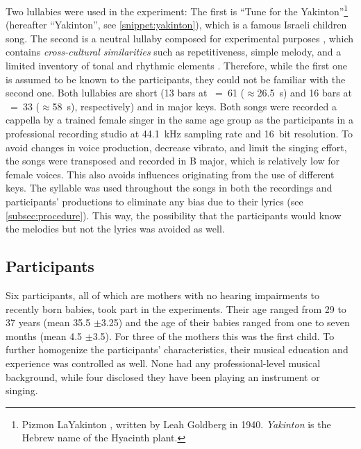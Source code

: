 Two lullabies were used in the experiment: The first is \enquote{Tune for the Yakinton}\footnote{Pizmon LaYakinton%
, written by Leah Goldberg in 1940. \emph{Yakinton} is the Hebrew name of the Hyacinth plant.} (hereafter \enquote{Yakinton}, see \cref{snippet:yakinton}), which is a famous Israeli children song.
The second is a neutral lullaby composed for experimental purposes \citep[][pp.~22-47, see \cref{snippet:uni-lullaby}]{Twig2016universal}, which contains \emph{cross-cultural similarities} such as repetitiveness, simple melody, and a limited inventory of tonal and rhythmic elements \citep{Unyk1992lullabies, Trehub1993maternal}.
Therefore, while the first one is assumed to be known to the participants, they could not be familiar with the second one.
Both lullabies are short (13 bars at \musQuarter~=~61 ($\approx$\SI{26.5}{\second}) and 16 bars at \musQuarterDotted~=~33 ($\approx$\SI{58}{\second}), respectively) and in major keys.
Both songs were recorded a cappella by a trained female singer in the same age group as the participants in a professional recording studio at \SI{44.1}{\kilo\hertz} sampling rate and 16~bit resolution.
To avoid changes in voice production, decrease vibrato, and limit the singing effort, the songs were transposed and recorded in B major, which is relatively low for female voices.
This also avoids influences originating from the use of different keys.
The syllable \textipa{[na]} was used throughout the songs in both the recordings and participants' productions to eliminate any bias due to their lyrics (see \cref{subsec:procedure}).
This way, the possibility that the participants would know the melodies but not the lyrics was avoided as well.

\subsection{Participants}
\label{subsec:participants}

Six participants, all of which are mothers with no hearing impairments to recently born babies, took part in the experiments.
Their age ranged from 29 to 37 years (mean 35.5 $\pm$3.25) and the age of their babies ranged from one to seven months (mean 4.5 $\pm$3.5).
For three of the mothers this was the first child.
To further homogenize the participants' characteristics, their musical education and experience was controlled as well.
None had any professional-level musical background, while four disclosed they have been playing an instrument or singing.

